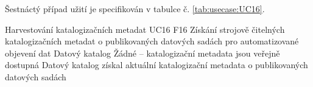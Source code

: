 
Šestnáctý případ užití je specifikován v tabulce č. \ref{tab:usecase:UC16}.

\begin{UseCaseTable}
  {Harvestování katalogizačních metadat}
  {UC16}
  {F16}
  {Získání strojově čitelných katalogizačních metadat o publikovaných datových sadách pro automatizované objevení dat}
  {Datový katalog}
  {}
  {Žádné -- katalogizační metadata jsou veřejně dostupná}
  {Datový katalog získal aktuální katalogizační metadata o publikovaných datových sadách}


\end{UseCaseTable}
